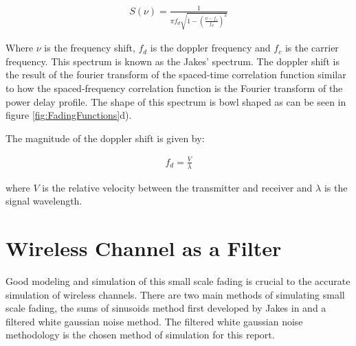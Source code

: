 \begin{align}
	S(\nu) = \frac{1}{\pi f_{d} \sqrt{1 - %
		(\frac{\nu - f_{c}}{f_{d}})^{2}}}
\end{align}

Where $\nu$ is the frequency shift, $f_{d}$ is the %
doppler frequency and $f_{c}$ is the carrier frequency. %
This spectrum is known as the Jakes' spectrum\cite{Iskander}. %
The doppler shift is the result of the fourier transform %
of the spaced-time correlation function similar to how %
the spaced-frequency correlation function is the %
Fourier transform of the power delay profile. The %
shape of this spectrum is bowl shaped as can be seen in %
figure \ref{fig:FadingFunctions}d).

The magnitude of the doppler shift is given by:

\begin{align}
	f_{d} = \frac{V}{\lambda}
\end{align}

where $V$ is the relative velocity between the %
transmitter and receiver and $\lambda$ is the signal %
wavelength.

\section{Wireless Channel as a Filter}

Good modeling and simulation of this small scale fading %
is crucial to the accurate simulation of wireless channels. %
There are two main methods of simulating small scale fading, %
the sums of sinusoids method first developed by Jakes in %
\cite{Jakes74} and a filtered white gaussian noise method. %
The filtered white gaussian noise methodology is the chosen %
method of simulation for this report.







